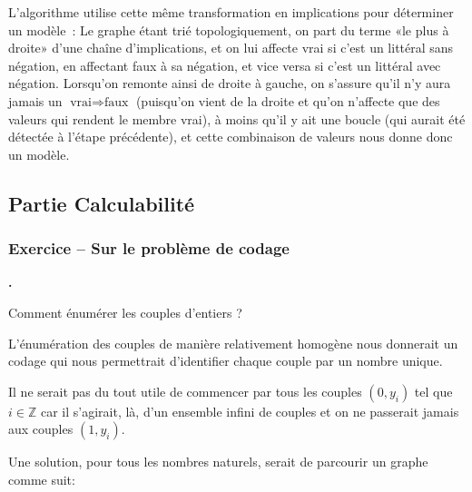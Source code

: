 \documentclass{article}
\newcounter{exocount}
\newcounter{enoncecount}
\newenvironment{enonce}
{
\stepcounter{enoncecount}
\bf\small \arabic{enoncecount}.
\begin{bf}
}
{
\end{bf}
}
\begin{document}
L'algorithme utilise cette même transformation en implications pour déterminer un modèle~: Le graphe étant trié topologiquement, on part du
terme «le plus à droite» d'une chaîne d'implications, et on lui affecte vrai si c'est un littéral sans négation, en affectant faux à sa
négation, et vice versa si c'est un littéral avec négation. Lorsqu'on remonte ainsi de droite à gauche, on s'assure qu'il n'y aura jamais un
$\text{vrai} \Rightarrow \text{faux}$ (puisqu'on vient de la droite et qu'on n'affecte que des valeurs qui rendent le membre vrai), à moins
qu'il y ait une boucle (qui aurait été détectée à l'étape précédente), et cette combinaison de valeurs nous donne donc un modèle.

\subsection{Partie Calculabilité}

\subsubsection*{Exercice \bf\small {} -- Sur le problème de codage}
\setcounter{enoncecount}{0}

\begin{enonce}
Comment énumérer les couples d'entiers ?
\end{enonce}


L'énumération des couples de manière relativement homogène nous donnerait un codage qui nous permettrait d'identifier chaque couple par un nombre unique. 

Il ne serait pas du tout utile de commencer par tous les couples $(0,y_{i})$  tel que $i \in \mathbb{Z}$ car il s'agirait, là, d'un ensemble infini de couples et on ne passerait jamais aux couples $(1, y_{i})$. 

Une solution, pour tous les nombres naturels, serait de parcourir un graphe comme suit:
\end{document}
